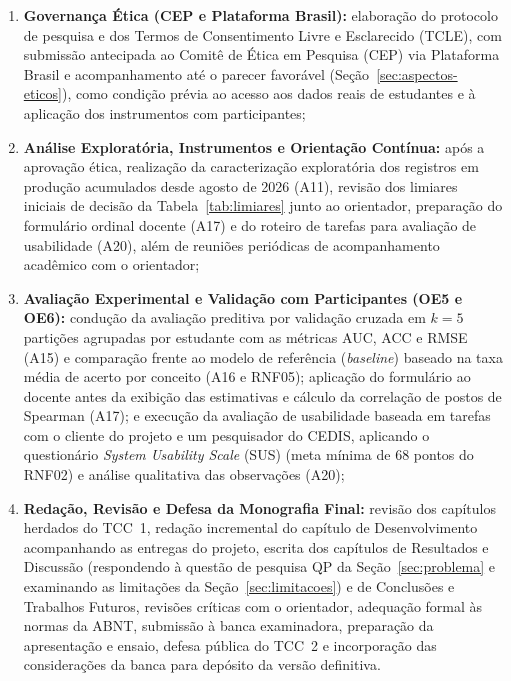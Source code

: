 \begin{enumerate}
    \item \textbf{Governança Ética (CEP e Plataforma Brasil):} elaboração do protocolo de pesquisa e dos Termos de Consentimento Livre e Esclarecido (TCLE), com submissão antecipada ao Comitê de Ética em Pesquisa (CEP) via Plataforma Brasil e acompanhamento até o parecer favorável (Seção~\ref{sec:aspectos-eticos}), como condição prévia ao acesso aos dados reais de estudantes e à aplicação dos instrumentos com participantes;

    \item \textbf{Análise Exploratória, Instrumentos e Orientação Contínua:} após a aprovação ética, realização da caracterização exploratória dos registros em produção acumulados desde agosto de 2026 (A11), revisão dos limiares iniciais de decisão da Tabela~\ref{tab:limiares} junto ao orientador, preparação do formulário ordinal docente (A17) e do roteiro de tarefas para avaliação de usabilidade (A20), além de reuniões periódicas de acompanhamento acadêmico com o orientador;

    \item \textbf{Avaliação Experimental e Validação com Participantes (OE5 e OE6):} condução da avaliação preditiva por validação cruzada em $k = 5$ partições agrupadas por estudante com as métricas AUC, ACC e RMSE (A15) e comparação frente ao modelo de referência (\textit{baseline}) baseado na taxa média de acerto por conceito (A16 e RNF05); aplicação do formulário ao docente antes da exibição das estimativas e cálculo da correlação de postos de Spearman (A17); e execução da avaliação de usabilidade baseada em tarefas com o cliente do projeto e um pesquisador do CEDIS, aplicando o questionário \textit{System Usability Scale} (SUS) \cite{brooke_sus_1996} (meta mínima de 68 pontos do RNF02) e análise qualitativa das observações (A20);

    \item \textbf{Redação, Revisão e Defesa da Monografia Final:} revisão dos capítulos herdados do TCC~1, redação incremental do capítulo de Desenvolvimento acompanhando as entregas do projeto, escrita dos capítulos de Resultados e Discussão (respondendo à questão de pesquisa QP da Seção~\ref{sec:problema} e examinando as limitações da Seção~\ref{sec:limitacoes}) e de Conclusões e Trabalhos Futuros, revisões críticas com o orientador, adequação formal às normas da ABNT, submissão à banca examinadora, preparação da apresentação e ensaio, defesa pública do TCC~2 e incorporação das considerações da banca para depósito da versão definitiva.
\end{enumerate}

